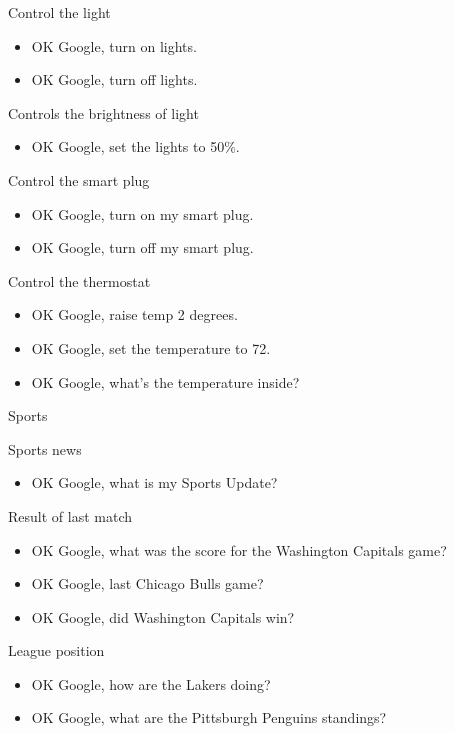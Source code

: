 \documentclass[
  a4paper,
]{article}
\providecommand{\tightlist}{%
  \setlength{\itemsep}{0pt}\setlength{\parskip}{0pt}}\usepackage{longtable,booktabs,array}
\begin{document}
Control the light

\begin{itemize}
\item
  OK Google, turn on lights.
\item
  OK Google, turn off lights.
\end{itemize}

Controls the brightness of light

\begin{itemize}
\tightlist
\item
  OK Google, set the lights to 50\%.
\end{itemize}

Control the smart plug

\begin{itemize}
\item
  OK Google, turn on my smart plug.
\item
  OK Google, turn off my smart plug.
\end{itemize}

Control the thermostat

\begin{itemize}
\item
  OK Google, raise temp 2 degrees.
\item
  OK Google, set the temperature to 72.
\item
  OK Google, what's the temperature inside?
\end{itemize}

Sports

Sports news

\begin{itemize}
\tightlist
\item
  OK Google, what is my Sports Update?
\end{itemize}

Result of last match

\begin{itemize}
\item
  OK Google, what was the score for the Washington Capitals game?
\item
  OK Google, last Chicago Bulls game?
\item
  OK Google, did Washington Capitals win?
\end{itemize}

League position

\begin{itemize}
\item
  OK Google, how are the Lakers doing?
\item
  OK Google, what are the Pittsburgh Penguins standings?
\end{itemize}
\end{document}
